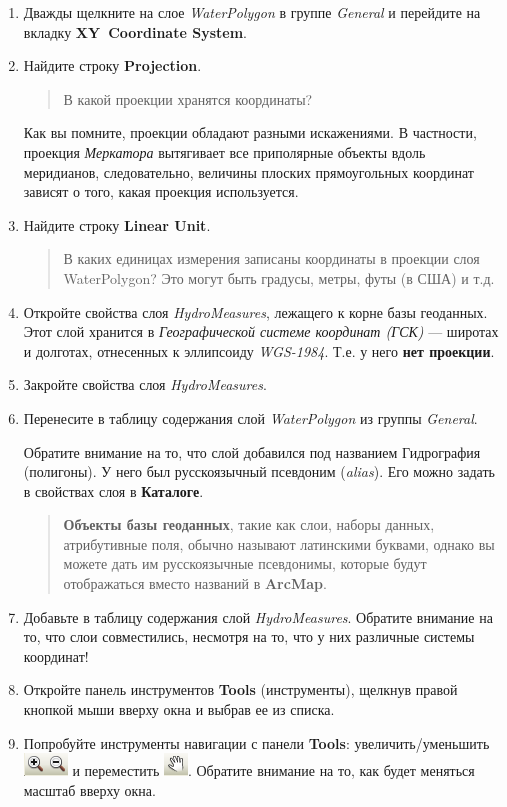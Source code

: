 \documentclass[]{book}
\theoremstyle{definition}
\theoremstyle{definition}
\theoremstyle{definition}
\theoremstyle{remark}
\begin{document}
\begin{enumerate}
\def\labelenumi{\arabic{enumi}.}
\item
  Дважды щелкните на слое \emph{WaterPolygon} в группе \emph{General} и
  перейдите на вкладку \textbf{XY~Coordinate System}.
\item
  Найдите строку \textbf{Projection}.

  \begin{quote}
  В какой проекции хранятся координаты?
  \end{quote}

  Как вы помните, проекции обладают разными искажениями. В частности,
  проекция \emph{Меркатора} вытягивает все приполярные объекты вдоль
  меридианов, следовательно, величины плоских прямоугольных координат
  зависят о того, какая проекция используется.
\item
  Найдите строку \textbf{Linear Unit}.

  \begin{quote}
  В каких единицах измерения записаны координаты в проекции слоя
  WaterPolygon? Это могут быть градусы, метры, футы (в США) и т.д.
  \end{quote}
\item
  Откройте свойства слоя \emph{HydroMeasures}, лежащего к корне базы
  геоданных. Этот слой хранится в \emph{Географической системе координат
  (ГСК)} --- широтах и долготах, отнесенных к эллипсоиду
  \emph{WGS-1984}. Т.е. у него \textbf{нет проекции}.
\item
  Закройте свойства слоя \emph{HydroMeasures}.
\item
  Перенесите в таблицу содержания слой \emph{WaterPolygon} из группы
  \emph{General}.

  Обратите внимание на то, что слой добавился под названием Гидрография
  (полигоны). У него был русскоязычный псевдоним (\emph{alias}). Его
  можно задать в свойствах слоя в \textbf{Каталоге}.

  \begin{quote}
  \textbf{Объекты базы геоданных}, такие как слои, наборы данных,
  атрибутивные поля, обычно называют латинскими буквами, однако вы
  можете дать им русскоязычные псевдонимы, которые будут отображаться
  вместо названий в \textbf{ArcMap}.
  \end{quote}
\item
  Добавьте в таблицу содержания слой \emph{HydroMeasures}. Обратите
  внимание на то, что слои совместились, несмотря на то, что у них
  различные системы координат!
\item
  Откройте панель инструментов \textbf{Tools} (инструменты), щелкнув
  правой кнопкой мыши вверху окна и выбрав ее из списка.
\item
  Попробуйте инструменты навигации с панели \textbf{Tools}:
  увеличить/уменьшить \includegraphics{images/Ex01/image12.png} и
  переместить \includegraphics{images/Ex01/image13.png}. Обратите
  внимание на то, как будет меняться масштаб вверху окна.


\end{enumerate}
\end{document}

